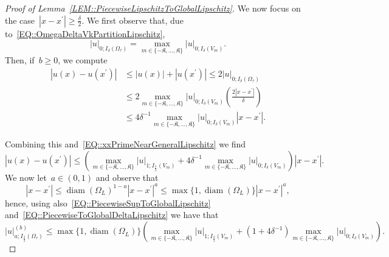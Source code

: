 \documentclass[12pt,a4paper]{amsart}
\numberwithin{equation}{section}
\theoremstyle{definition}
\theoremstyle{remark}
\newcommand{\abs}[1]{\left\lvert#1\right\rvert}
\renewcommand{\leq}{\leqslant}
\renewcommand{\geq}{\geqslant}
\begin{document}
\begin{appendix}
\begin{proof}[Proof of Lemma~\ref{LEM::PiecewiseLipschitzToGlobalLipschitz}]
    We now focus on the case~$\abs{x-x^\prime} \geq \frac{\delta}{2}$. We first observe that, due to~\eqref{EQ::OmegaDeltaVkPartitionLipschitz},
    \begin{equation}\label{EQ::PiecewiseSupToGlobalLipschitz}
        \abs{u}_{0;I_\delta(\Omega_\tau)} = \max_{m \in \{-\mathfrak{K},\dots,\mathfrak{K}\}}\abs{u}_{0;I_\delta(V_m)}.
    \end{equation}
    Then, if~$b \geq 0$, we compute
    \begin{align}\label{OLD::EQ::xxprimeFarPositiveB}
        \abs{u(x)-u(x^\prime)} &\leq \abs{u(x)}+\abs{u(x^\prime)} \leq 2\abs{u}_{0;I_\delta(\Omega_\tau)}\\
            &\leq 2\max_{m \in \{-\mathfrak{K},\dots,\mathfrak{K}\}}\abs{u}_{0;I_\delta(V_m)}{\left(\frac{2\abs{x-x^\prime}}{\delta}\right)}\\
            &\leq 4{\delta^{-1}}\max_{m \in \{-\mathfrak{K},\dots,\mathfrak{K}\}}\abs{u}_{0;I_\delta(V_m)}\abs{x-x^\prime}.
    \end{align}

    Combining this and~\eqref{EQ::xxPrimeNearGeneralLipschitz} we find
    \begin{equation}\label{EQ::PiecewiseToGlobalDeltaLipschitz}
        \abs{u(x)-u(x^\prime)} \leq \left(\max_{m \in \{-\mathfrak{K},\dots,\mathfrak{K}\}} \abs{u}_{1; I_{\frac{\delta}{2}}(V_m)} + 4{\delta^{-1}}\max_{m \in \{-\mathfrak{K},\dots,\mathfrak{K}\}}\abs{u}_{0;I_\delta(V_m)}\right) \abs{x-x^\prime}.
    \end{equation}
    We now let~$a \in (0,1)$ and observe that
    \begin{equation}\label{EQ::LipschitzToHolderDistance}
        \abs{x-x^\prime} \leq {\operatorname{diam}(\Omega_L)}^{1-a} \abs{x-x^\prime}^a \leq \max\{1,\operatorname{diam}(\Omega_L)\} \abs{x-x^\prime}^a,
    \end{equation}
    hence, using also~\eqref{EQ::PiecewiseSupToGlobalLipschitz} and~\eqref{EQ::PiecewiseToGlobalDeltaLipschitz} we have that
    \begin{equation}
        \abs{u}_{a; I_{\frac{\delta}{2}}(\Omega_\tau)}^{(b)} \leq \max\{1,\operatorname{diam}(\Omega_L)\} \left(\max_{m \in \{-\mathfrak{K},\dots,\mathfrak{K}\}} \abs{u}_{1; I_{\frac{\delta}{2}}(V_m)} + (1+4{\delta^{-1}})\max_{m \in \{-\mathfrak{K},\dots,\mathfrak{K}\}}\abs{u}_{0;I_\delta(V_m)}\right).
    \end{equation}


\end{proof}
\end{appendix}
\end{document}
